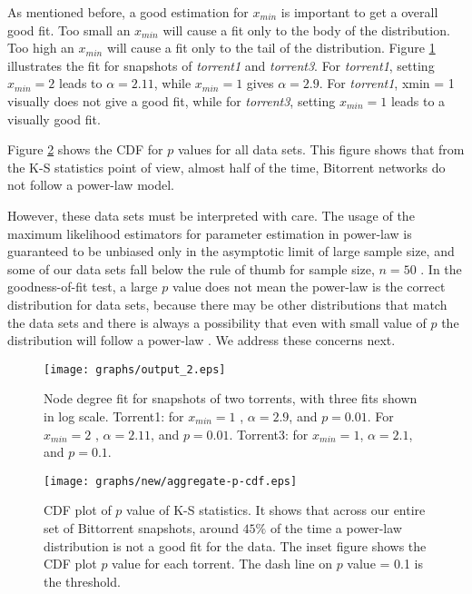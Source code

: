 \documentclass[paper]{ieice}
\begin{document}
As mentioned before, a good estimation for $x_{min}$ is important to get a overall good fit.
Too small an $x_{min}$ will cause a fit only to the body of the distribution.
Too high an $x_{min}$ will cause a fit only to the tail of the distribution.
Figure  \ref{fig:fitting} illustrates the fit for snapshots of \emph{torrent1} and \emph{torrent3}.
For \emph{torrent1}, setting $x_{min}=2$  leads to  $\alpha=2.11$, while $x_{min}=1$ gives $\alpha=2.9$.
For \emph{torrent1}, xmin = 1 visually does not give a good fit, while for  \emph{torrent3}, setting $x_{min}=1$ leads to a visually good fit.

Figure  \ref{fig:cdf-p} shows the CDF for $p$ values for all data sets. 
This figure shows that from the K-S statistics point of view, almost half of the time, Bitorrent networks do not follow a power-law model.

However, these data sets must be interpreted with care. 
The usage of the maximum likelihood estimators for parameter estimation in power-law is guaranteed to be unbiased only in the asymptotic limit of large sample size, and some of our data sets fall below the rule of thumb for sample size, $n=50$ \cite{clauset2009power}. 
In the goodness-of-fit test, a large $p$ value does not mean the power-law  is the correct distribution for data sets, because there may be other distributions that match the data sets and there is always a possibility that even with small value of $p$ the distribution will follow a power-law \cite{clauset2009power}. 
We address these concerns next.

\begin{figure}[!tb]
\begin{center}
\texttt{[image: graphs/output\_2.eps]}
\end{center}
\caption{Node degree fit for snapshots of two torrents, with three fits shown in log scale. Torrent1: for $x_{min}=1$ , $\alpha = 2.9$, and $p=0.01$. For $x_{min}=2$ , $\alpha = 2.11$, and $p = 0.01$. Torrent3: for $x_{min}=1$, $\alpha = 2.1$, and $p = 0.1$. }
\label{fig:fitting}
\vspace{-2mm}
\end{figure}

\begin{figure}[!tb]
\begin{center}
\texttt{[image: graphs/new/aggregate-p-cdf.eps]}
\end{center}
\caption{CDF plot of $p$ value of K-S statistics. It shows that across our entire set of Bittorrent snapshots, around $45\%$ of the time a power-law distribution is not a good fit for the data. 
The inset figure shows the CDF plot $p$ value for each torrent. The dash line on $p$ value = 0.1 is the threshold.} 
\label{fig:cdf-p}
\vspace{-2mm}
\end{figure}
\end{document}
